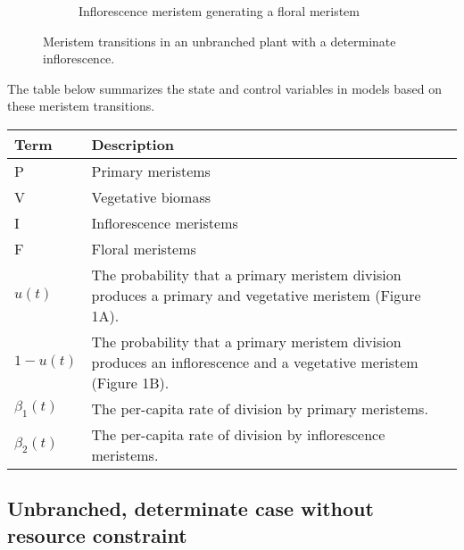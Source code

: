 \documentclass[12pt, oneside]{article}   	%
\begin{document}
\begin{figure}[hbt!]
\begin{subfigure}{.25\textwidth}
    \caption{Inflorescence meristem generating a floral meristem}
  \end{subfigure}
        \caption{Meristem transitions in an unbranched plant with a determinate inflorescence.}
    \label{fig:transitions-unbranched-determinate}
\end{figure}

The table below summarizes the state and control variables in models based on these meristem transitions.
%
\begin{table}[hbt!]
\footnotesize
\begin{tabularx}{\linewidth}{|l|X|}
\hline
\textbf{Term} & \textbf{Description} \\ \hline
 P    & Primary meristems            \\ \hline
 V   &  Vegetative biomass         \\ \hline
 I   &  Inflorescence meristems          \\ \hline
 F   &  Floral meristems          \\ \hline
 $u(t)$   &  The probability that a primary meristem division produces a primary and vegetative meristem (Figure 1A).       \\ \hline
  $1-u(t)$   &  The probability that a primary meristem division produces an inflorescence and a vegetative meristem (Figure 1B).       \\ \hline
   $\beta_1(t)$  &  The per-capita rate of division by primary meristems.     \\ \hline
  $\beta_2(t)$  &  The per-capita rate of division by inflorescence meristems.     \\ \hline
\end{tabularx}
\end{table}

\clearpage
\newpage

\subsection*{Unbranched, determinate case without resource constraint}
\end{document}

